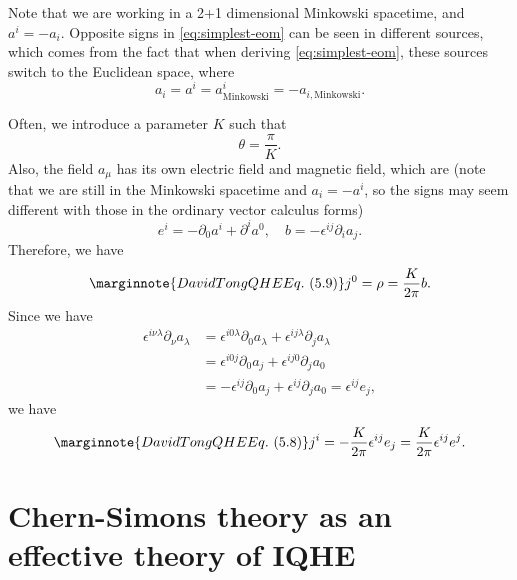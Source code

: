 \documentclass[hyperref, a4paper]{article}
\begin{document}
\begin{note*}{}
    Note that we are working in a 2+1 dimensional Minkowski spacetime, and $a^i = - a_i$. 
    Opposite signs in \eqref{eq:simplest-eom} can be seen in different sources, which comes from 
    the fact that when deriving \eqref{eq:simplest-eom}, these sources switch to the Euclidean 
    space, where 
    \[
        a_i = a^i = a^i_\text{Minkowski} = - a_{i, \text{Minkowski}}.
    \]
\end{note*}

Often, we introduce a parameter $K$ such that  
\begin{equation}
    \theta = \frac{\pi}{K}.
\end{equation}
Also, the field $a_\mu$ has its own electric field and magnetic field, which are (note that we are still in the Minkowski spacetime and $a_i = - a^i$, so the signs may seem different with those in the ordinary vector calculus forms)
\begin{equation}
    e^i = - \partial_0 a^i + \partial^i a^0, \quad b = - \epsilon^{ij} \partial_i a_j.
\end{equation}
Therefore, we have 
\begin{equation} \marginnote{David Tong QHE Eq.~(5.9)}
    j^0 = \rho = \frac{K}{2\pi} b.
    \label{eq:charge-flux-composite}
\end{equation}
Since we have 
\[
    \begin{aligned}
        \epsilon^{i \nu \lambda} \partial_\nu a_\lambda &= \epsilon^{i 0 \lambda} \partial_0 a_\lambda + \epsilon^{i j \lambda} \partial_j a_\lambda \\
        &= \epsilon^{i 0 j} \partial_0 a_j + \epsilon^{i j 0} \partial_j a_0 \\ 
        &= - \epsilon^{ij} \partial_0 a_j + \epsilon^{ij}  \partial_j a_0 = \epsilon^{ij} e_j ,
    \end{aligned}
\]
we have 
\begin{equation} \marginnote{David Tong QHE Eq.~(5.8)}
    j^i = - \frac{K}{2\pi} \epsilon^{ij} e_j = \frac{K}{2\pi} \epsilon^{ij} e^j.
    \label{eq:current-from-electric-field-chern-simons}
\end{equation}

\section{Chern-Simons theory as an effective theory of IQHE}
\end{document}
